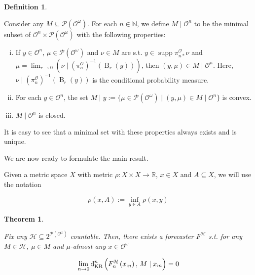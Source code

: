 \documentclass[11pt]{article}
\theoremstyle{definition}
\newtheorem{definition}{Definition}%
\theoremstyle{plain}
\newtheorem{theorem}{Theorem}%
\newcommand{\Nats}{\mathbb{N}}
\newcommand{\Reals}{\mathbb{R}}
\newcommand{\B}{\operatorname{B}}
\newcommand{\PM}{\mathcal{P}}
\DeclareMathOperator{\Sp}{supp}
\newcommand{\DKR}{\operatorname{d}_{\textnormal{KR}}}
\newcommand{\Ob}{\mathcal{O}}
\newcommand{\OO}{\Ob^\omega}
\newcommand{\PO}{\pi^\Ob}
\newcommand{\PMO}{\PM(\OO)}
\newcommand{\MC}{\mathcal{H}}
\begin{document}
\begin{samepage}
\begin{definition}
\label{def:update_incomplete}

Consider any $M \subseteq \PMO$. For each $n \in \Nats$, we define $M \mid \Ob^n$ to be the minimal subset of $\Ob^n \times \PMO$ with the following properties:

\begin{enumerate}[i.]

\item If $y \in \Ob^n$, $\mu \in \PMO$ and $\nu \in M$ are s.t. $y \in \Sp \PO_{n*}\nu$ and $\mu = \lim_{r \rightarrow 0}{\left(\nu \mid \left(\PO_n\right)^{-1}\left(\B_r\left(y\right)\right)\right)}$, then $\left(y,\mu\right) \in M \mid \Ob^n$. Here, $\nu \mid \left(\PO_n\right)^{-1}\left(\B_r\left(y\right)\right)$ is the conditional probability measure.
\item For each $y \in \Ob^n$, the set $M \mid y:=\{\mu \in \PMO \mid \left(y,\mu\right) \in M \mid \Ob^n\}$ is convex.
\item $M \mid \Ob^n$ is closed.

\end{enumerate}

It is easy to see that a minimal set with these properties always exists and is unique.

\end{definition}
\end{samepage}

We are now ready to formulate the main result.

Given a metric space $X$ with metric $\rho: X \times X \rightarrow \Reals$, $x \in X$ and $A \subseteq X$, we will use the notation

\begin{equation}
\rho\left(x,A\right):=\inf_{y \in A} \rho\left(x,y\right)
\end{equation}

\begin{theorem}
\label{thm:main}

Fix any $\MC \subseteq 2^{\PMO}$ countable. Then, there exists a forecaster $F^\MC$ s.t. for any $M \in \MC$, $\mu \in M$ and $\mu$-almost any $x \in \OO$

\begin{equation}
\label{eqn:thm_main}
\lim_{n \rightarrow 0} \DKR^n\left(F^\MC_n\left(x_{:n}\right),\, M \mid x_{:n}\right) = 0
\end{equation}

\end{theorem}
\end{document}

